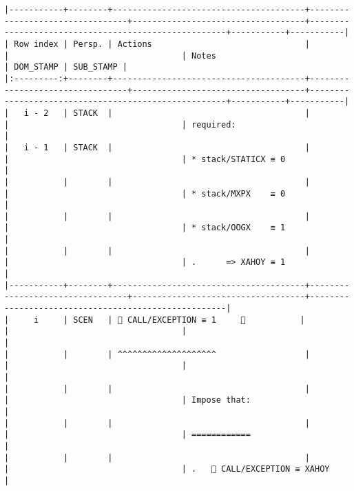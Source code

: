 \documentclass[varwidth=\maxdimen,margin=0.5cm,multi={verbatim}]{standalone}
\begin{document}
\begin{verbatim}
|-----------+--------+---------------------------------------+---------------------------------+-----------------------------------+-----------------------------------------------------+-----------+-----------|
| Row index | Persp. | Actions                               |                                 |                                   | Notes                                               | DOM_STAMP | SUB_STAMP |
|:---------:+--------+---------------------------------------+---------------------------------+-----------------------------------+-----------------------------------------------------+-----------+-----------|
|   i - 2   | STACK  |                                       |                                 |                                   | required:                                           |
|   i - 1   | STACK  |                                       |                                 |                                   | * stack/STATICX ≡ 0                                 |
|           |        |                                       |                                 |                                   | * stack/MXPX    ≡ 0                                 |
|           |        |                                       |                                 |                                   | * stack/OOGX    ≡ 1                                 |
|           |        |                                       |                                 |                                   | .      => XAHOY ≡ 1                                 |
|-----------+--------+---------------------------------------+---------------------------------+-----------------------------------+-----------------------------------------------------|
|     i     | SCEN   |  CALL/EXCEPTION ≡ 1     👋           |                                 |                                   |                                                     |
|           |        | ^^^^^^^^^^^^^^^^^^^^                  |                                 |                                   |                                                     |
|           |        |                                       |                                 |                                   | Impose that:                                        |
|           |        |                                       |                                 |                                   | ============                                        |
|           |        |                                       |                                 |                                   | .    CALL/EXCEPTION ≡ XAHOY                        |

\end{verbatim}
\end{document}
